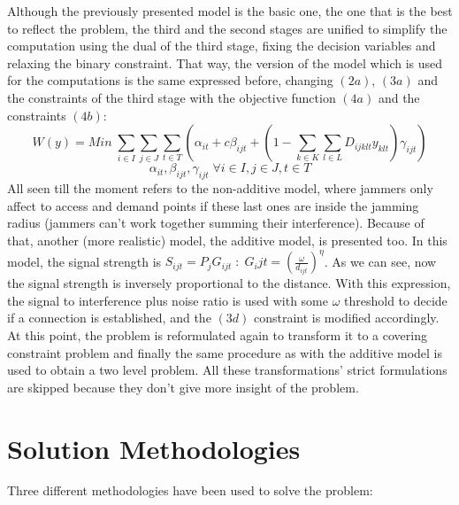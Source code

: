 \documentclass[runningheads]{llncs}
\begin{document}
Although the previously presented model is the basic one, the one that is the best to reflect the problem, the third and the second stages are unified to simplify the computation using the dual of the third stage, fixing the decision variables and relaxing the binary constraint. That way, the version of the model which is used for the computations is the same expressed before, changing $(2a)$, $(3a)$ and the constraints of the third stage with the objective function $(4a)$ and the constraints $(4b)$:
\small
\begin{equation}\tag{4a}
    W(y) = Min \; \sum_{i \in I} \sum_{j \in J} \sum_{t \in T} (\alpha_{it} + c \beta_{ijt} + (1 - \sum_{k \in K} \sum_{l \in L} D_{ijklt} y_{klt}) \gamma_{ijt})
\end{equation}
\begin{equation}\tag{4b}
    \alpha_{it}, \beta_{ijt}, \gamma_{ijt} \; \forall i \in I, j \in J, t \in T
\end{equation}
\normalsize
All seen till the moment refers to the non-additive model, where jammers only affect to access and demand points if these last ones are inside the jamming radius (jammers can't work together summing their interference). Because of that, another (more realistic) model, the additive model, is presented too. In this model, the signal strength is $S_{ijt}=P_j G_{ijt} \; : \; G_ijt=(\frac{\omega}{d_{ijt}})^\eta$. As we can see, now the signal strength is inversely proportional to the distance. With this expression, the signal to interference plus noise ratio is used with some $\omega$ threshold to decide if a connection is established, and the $(3d)$ constraint is modified accordingly. At this point, the problem is reformulated again to transform it to a covering constraint problem and finally the same procedure as with the additive model is used to obtain a two level problem. All these transformations' strict formulations are skipped because they don't give more insight of the problem.


\section{Solution Methodologies}

Three different methodologies have been used to solve the problem:
\end{document}
